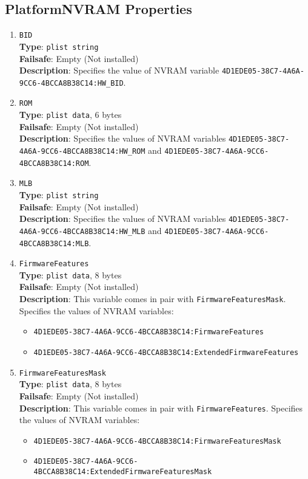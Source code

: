 \documentclass[]{article}
\providecommand{\tightlist}{%
  \setlength{\itemsep}{0pt}\setlength{\parskip}{0pt}}
\begin{document}
\subsection{PlatformNVRAM Properties}\label{platforminfonvram}

\begin{enumerate}
\item
  \texttt{BID}\\
  \textbf{Type}: \texttt{plist\ string}\\
  \textbf{Failsafe}: Empty (Not installed)\\
  \textbf{Description}: Specifies the value of NVRAM variable
  \texttt{4D1EDE05-38C7-4A6A-9CC6-4BCCA8B38C14:HW\_BID}.

\item
  \texttt{ROM}\\
  \textbf{Type}: \texttt{plist\ data}, 6 bytes\\
  \textbf{Failsafe}: Empty (Not installed)\\
  \textbf{Description}: Specifies the values of NVRAM variables
  \texttt{4D1EDE05-38C7-4A6A-9CC6-4BCCA8B38C14:HW\_ROM} and
  \texttt{4D1EDE05-38C7-4A6A-9CC6-4BCCA8B38C14:ROM}.

\item
  \texttt{MLB}\\
  \textbf{Type}: \texttt{plist\ string}\\
  \textbf{Failsafe}: Empty (Not installed)\\
  \textbf{Description}: Specifies the values of NVRAM variables
  \texttt{4D1EDE05-38C7-4A6A-9CC6-4BCCA8B38C14:HW\_MLB} and
  \texttt{4D1EDE05-38C7-4A6A-9CC6-4BCCA8B38C14:MLB}.

\item
  \texttt{FirmwareFeatures}\\
  \textbf{Type}: \texttt{plist\ data}, 8 bytes\\
  \textbf{Failsafe}: Empty (Not installed)\\
  \textbf{Description}: This variable comes in pair with \texttt{FirmwareFeaturesMask}.
  Specifies the values of NVRAM variables:
  \begin{itemize}
  \tightlist
  \item \texttt{4D1EDE05-38C7-4A6A-9CC6-4BCCA8B38C14:FirmwareFeatures}
  \item \texttt{4D1EDE05-38C7-4A6A-9CC6-4BCCA8B38C14:ExtendedFirmwareFeatures}
  \end{itemize}

\item
  \texttt{FirmwareFeaturesMask}\\
  \textbf{Type}: \texttt{plist\ data}, 8 bytes\\
  \textbf{Failsafe}: Empty (Not installed)\\
  \textbf{Description}: This variable comes in pair with \texttt{FirmwareFeatures}.
  Specifies the values of NVRAM variables:
  \begin{itemize}
  \tightlist
  \item \texttt{4D1EDE05-38C7-4A6A-9CC6-4BCCA8B38C14:FirmwareFeaturesMask}
  \item \texttt{4D1EDE05-38C7-4A6A-9CC6-4BCCA8B38C14:ExtendedFirmwareFeaturesMask}
  \end{itemize}


\end{enumerate}
\end{document}
